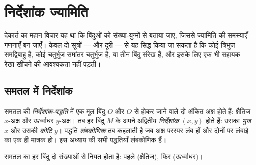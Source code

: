 \chapter{निर्देशांक ज्यामिति}\label{ch:g10:coordgeom}

देकार्त का महान विचार यह था कि बिंदुओं को संख्या-युग्मों से बताया जाए, जिससे
ज्यामिति की समस्याएँ गणनाएँ बन जाएँ। केवल दो सूत्रों ---  और दूरी ---
से यह सिद्ध किया जा सकता है कि कोई त्रिभुज समद्विबाहु है, कोई चतुर्भुज समांतर
चतुर्भुज है, या तीन बिंदु संरेख हैं, और इसके लिए एक भी सहायक रेखा खींचने की
आवश्यकता नहीं पड़ती।

\section{समतल में निर्देशांक}

\begin{definition}[निर्देशांक-पद्धति]\label{def:g10:coordgeom:system}
समतल की \emph{निर्देशांक-पद्धति} में एक मूल बिंदु
$O$ और $O$ से होकर जाने वाले दो अंकित अक्ष होते हैं: क्षैतिज $x$-अक्ष और
ऊर्ध्वाधर $y$-अक्ष। तब हर बिंदु $M$ के अपने अद्वितीय
\emph{निर्देशांक} $(x, y)$ होते हैं: उसका
\emph{भुज} $x$ और उसकी \emph{कोटि} $y$। पद्धति
\emph{लंबकोणिक} तब कहलाती है जब अक्ष परस्पर लंब हों
और दोनों पर लंबाई का एक ही मात्रक हो। इस अध्याय की सभी पद्धतियाँ लंबकोणिक
हैं।
\end{definition}

\begin{omfigure}

{\small समतल का हर बिंदु दो संख्याओं से नियत होता है: पहले  (क्षैतिज),
फिर  (ऊर्ध्वाधर)।}
\end{omfigure}

